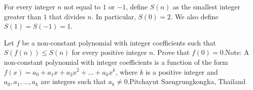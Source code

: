 For every integer $n$ not equal to $1$ or $-1$,  define $S(n)$ as the smallest integer greater than $1$ that divides $n$. In particular, $S(0)=2$. We also define $S(1) = S(-1) = 1$.

Let $f$ be a non-constant polynomial with integer coefficients such that $S(f(n)) \leq S(n)$ for every positive integer $n$. Prove that $f(0)=0$.Note: A non-constant polynomial with integer coefficients is a function of the form $f(x) = a_0 + a_1 x + a_2 x^2 + \ldots + a_k x^k$,  where $k$ is a positive integer and $a_0,a_1,\ldots,a_k$ are integers such that $a_k \neq 0$.Pitchayut Saengrungkongka, Thailand